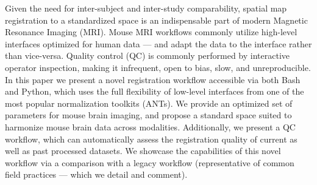 Given the need for inter-subject and inter-study comparability, spatial map registration to a standardized space is an indispensable part of modern Magnetic Resonance Imaging (MRI).
Mouse MRI workflows commonly utilize high-level interfaces optimized for human data --- and adapt the data to the interface rather than vice-versa.
Quality control (QC) is commonly performed by interactive operator inspection, making it infrequent, open to bias, slow, and unreproducible.
In this paper we present a novel registration workflow accessible via both Bash and Python, which uses the full flexibility of low-level interfaces from one of the most popular normalization toolkits (ANTs).
We provide an optimized set of parameters for mouse brain imaging, and propose a standard space suited to harmonize mouse brain data across modalities.
Additionally, we present a QC workflow, which can automatically assess the registration quality of current as well as past processed datasets.
We showcase the capabilities of this novel workflow via a comparison with a legacy workflow (representative of common field practices --- which we detail and comment).
